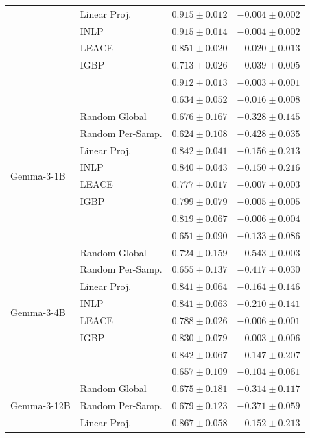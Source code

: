\begin{longtable}{ll rr}
   & Linear Proj. & $0.915{\pm}0.012$ & $-0.004{\pm}0.002$ \\
   & INLP & $0.915{\pm}0.014$ & $-0.004{\pm}0.002$ \\
   & LEACE & $0.851{\pm}0.020$ & $-0.020{\pm}0.013$ \\
   & IGBP & $0.713{\pm}0.026$ & $-0.039{\pm}0.005$ \\
   & \AmbGCE{} & $0.912{\pm}0.013$ & $-0.003{\pm}0.001$ \\
   & \TanGCE{} & \textbf{$0.634{\pm}0.052$} & $-0.016{\pm}0.008$ \\
  \midrule
  \multirow{8}{*}{Gemma-3-1B} & Random Global & $0.676{\pm}0.167$ & $-0.328{\pm}0.145$ \\
   & Random Per-Samp. & $0.624{\pm}0.108$ & $-0.428{\pm}0.035$ \\
   & Linear Proj. & $0.842{\pm}0.041$ & $-0.156{\pm}0.213$ \\
   & INLP & $0.840{\pm}0.043$ & $-0.150{\pm}0.216$ \\
   & LEACE & $0.777{\pm}0.017$ & $-0.007{\pm}0.003$ \\
   & IGBP & $0.799{\pm}0.079$ & $-0.005{\pm}0.005$ \\
   & \AmbGCE{} & $0.819{\pm}0.067$ & $-0.006{\pm}0.004$ \\
   & \TanGCE{} & \textbf{$0.651{\pm}0.090$} & $-0.133{\pm}0.086$ \\
  \midrule
  \multirow{8}{*}{Gemma-3-4B} & Random Global & $0.724{\pm}0.159$ & $-0.543{\pm}0.003$ \\
   & Random Per-Samp. & $0.655{\pm}0.137$ & $-0.417{\pm}0.030$ \\
   & Linear Proj. & $0.841{\pm}0.064$ & $-0.164{\pm}0.146$ \\
   & INLP & $0.841{\pm}0.063$ & $-0.210{\pm}0.141$ \\
   & LEACE & $0.788{\pm}0.026$ & $-0.006{\pm}0.001$ \\
   & IGBP & $0.830{\pm}0.079$ & $-0.003{\pm}0.006$ \\
   & \AmbGCE{} & $0.842{\pm}0.067$ & $-0.147{\pm}0.207$ \\
   & \TanGCE{} & \textbf{$0.657{\pm}0.109$} & $-0.104{\pm}0.061$ \\
  \midrule
  \multirow{8}{*}{Gemma-3-12B} & Random Global & $0.675{\pm}0.181$ & $-0.314{\pm}0.117$ \\
   & Random Per-Samp. & $0.679{\pm}0.123$ & $-0.371{\pm}0.059$ \\
   & Linear Proj. & $0.867{\pm}0.058$ & $-0.152{\pm}0.213$ \\

\end{longtable}
